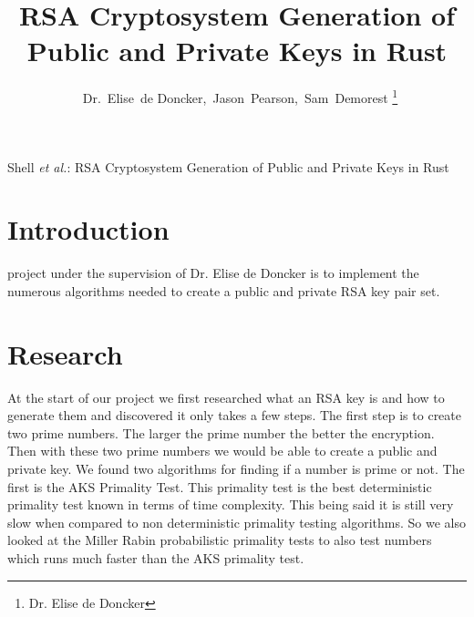\documentclass[12pt,journal,compsoc]{IEEEtran}
\begin{document}
\lstset{language=bash}
%
\title{RSA Cryptosystem Generation of Public and Private Keys in Rust}
\author{~Dr.~Elise~de Doncker,~Jason~Pearson,~Sam~Demorest%
\thanks{Dr. Elise de Doncker}}

\markboth{}%
{Shell \MakeLowercase{\textit{et al.}}: RSA Cryptosystem Generation of Public and Private Keys in Rust}





\maketitle

\IEEEdisplaynotcompsoctitleabstractindextext
\IEEEpeerreviewmaketitle



\section{Introduction}
 project under the supervision of Dr. Elise de Doncker is to implement the numerous algorithms needed to create a public and private RSA key pair set. 


\section{Research}
At the start of our project we first researched what an RSA key is and how to generate them and discovered it only takes a few steps. The first step is to create two prime numbers. The larger the prime number the better the encryption. Then with these two prime numbers we would be able to create a public and private key. 
\newline \indent We found two algorithms for finding if a number is prime or not. The first is the AKS Primality Test. This primality test is the best deterministic primality test known in terms of time complexity. This being said it is still very slow when compared to non deterministic primality testing algorithms. So we also looked at the Miller Rabin probabilistic primality tests to also test numbers which runs much faster than the AKS primality test.
\end{document}
